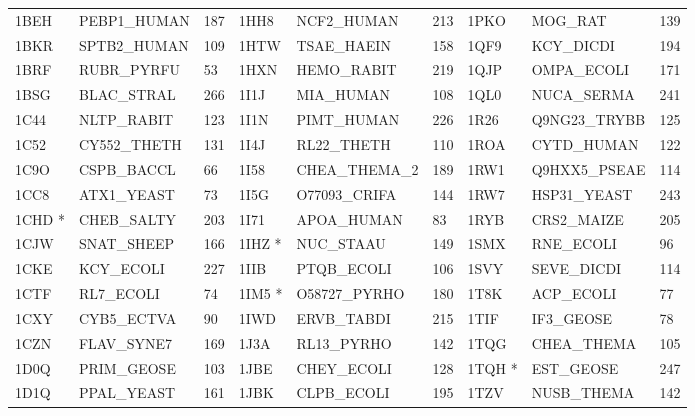 \documentclass{bioinfo}
\begin{document}
\begin{table}[!t]
{\begin{tabular}{lllllllll}
    1BEH   & PEBP1\_HUMAN & 187             & 1HH8   & NCF2\_HUMAN  & 213             & 1PKO   & MOG\_RAT     & 139             \\
    1BKR   & SPTB2\_HUMAN & 109             & 1HTW   & TSAE\_HAEIN  & 158             & 1QF9   & KCY\_DICDI   & 194             \\
    1BRF   & RUBR\_PYRFU  & 53              & 1HXN   & HEMO\_RABIT  & 219             & 1QJP   & OMPA\_ECOLI  & 171             \\
    1BSG   & BLAC\_STRAL  & 266             & 1I1J   & MIA\_HUMAN   & 108             & 1QL0   & NUCA\_SERMA  & 241             \\
    1C44   & NLTP\_RABIT  & 123             & 1I1N   & PIMT\_HUMAN  & 226             & 1R26   & Q9NG23\_TRYBB & 125             \\
    1C52   & CY552\_THETH & 131             & 1I4J   & RL22\_THETH  & 110             & 1ROA   & CYTD\_HUMAN  & 122             \\
    1C9O   & CSPB\_BACCL  & 66              & 1I58   & CHEA\_THEMA\_2 & 189             & 1RW1   & Q9HXX5\_PSEAE & 114             \\
    1CC8   & ATX1\_YEAST  & 73              & 1I5G   & O77093\_CRIFA & 144             & 1RW7   & HSP31\_YEAST & 243             \\
    1CHD *  & CHEB\_SALTY  & 203             & 1I71   & APOA\_HUMAN  & 83              & 1RYB   & CRS2\_MAIZE  & 205             \\
    1CJW   & SNAT\_SHEEP  & 166             & 1IHZ *  & NUC\_STAAU   & 149             & 1SMX   & RNE\_ECOLI   & 96              \\
    1CKE   & KCY\_ECOLI   & 227             & 1IIB   & PTQB\_ECOLI  & 106             & 1SVY   & SEVE\_DICDI  & 114             \\
    1CTF   & RL7\_ECOLI   & 74              & 1IM5 *  & O58727\_PYRHO & 180             & 1T8K   & ACP\_ECOLI   & 77              \\
    1CXY   & CYB5\_ECTVA  & 90              & 1IWD   & ERVB\_TABDI  & 215             & 1TIF   & IF3\_GEOSE   & 78              \\
    1CZN   & FLAV\_SYNE7  & 169             & 1J3A   & RL13\_PYRHO  & 142             & 1TQG   & CHEA\_THEMA  & 105             \\
    1D0Q   & PRIM\_GEOSE  & 103             & 1JBE   & CHEY\_ECOLI  & 128             & 1TQH *  & EST\_GEOSE   & 247             \\
    1D1Q   & PPAL\_YEAST  & 161             & 1JBK   & CLPB\_ECOLI  & 195             & 1TZV   & NUSB\_THEMA  & 142             \\

\end{tabular}}
\end{table}
\end{document}
